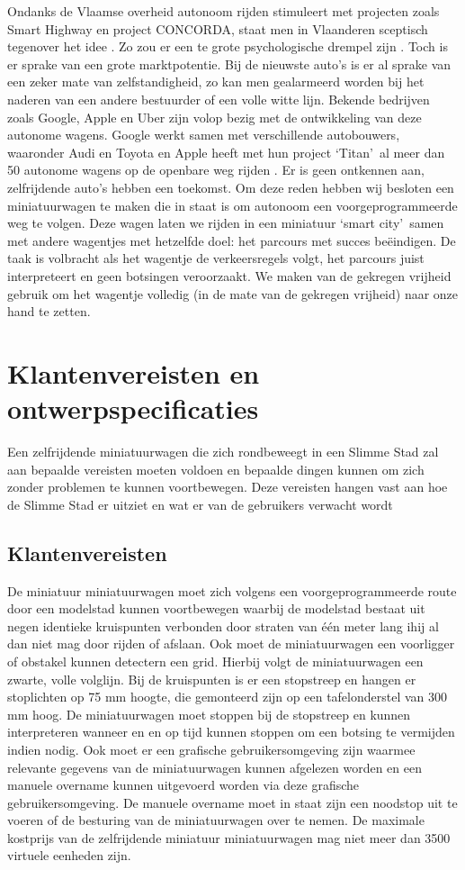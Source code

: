 \documentclass[a4paper,kulak]{kulakarticle}
\begin{document}
Ondanks de Vlaamse overheid autonoom rijden stimuleert met projecten zoals Smart Highway en project CONCORDA, staat men in Vlaanderen sceptisch tegenover het idee \cite{vbn}. Zo zou er een te grote psychologische drempel zijn \cite{scept}. Toch is er sprake van een grote marktpotentie. Bij de nieuwste auto's is er al sprake van een zeker mate van zelfstandigheid, zo kan men gealarmeerd worden bij het naderen van een andere bestuurder of een volle witte lijn. Bekende bedrijven zoals Google, Apple en Uber zijn volop bezig met de ontwikkeling van deze autonome wagens. Google werkt samen met verschillende autobouwers, waaronder Audi en Toyota en Apple heeft met hun project \lq Titan\rq\ al meer dan 50 autonome wagens op de openbare weg rijden \cite{bedrijven}. Er is geen ontkennen aan, zelfrijdende auto's hebben een toekomst. Om deze reden hebben wij besloten een miniatuurwagen te maken die in staat is om autonoom een voorgeprogrammeerde weg te volgen. Deze wagen laten we rijden in een miniatuur \lq smart city\rq\ samen met andere wagentjes met hetzelfde doel: het parcours met succes beëindigen. De taak is volbracht als het wagentje de verkeersregels volgt, het parcours juist interpreteert en geen botsingen veroorzaakt. We maken van de gekregen vrijheid gebruik om het wagentje volledig (in de mate van de gekregen vrijheid) naar onze hand te zetten.

\section{Klantenvereisten en ontwerpspecificaties}
Een zelfrijdende miniatuurwagen die zich rondbeweegt in een Slimme Stad zal aan bepaalde vereisten moeten voldoen en bepaalde dingen kunnen om zich zonder problemen te kunnen voortbewegen. Deze vereisten hangen vast aan hoe de Slimme Stad er uitziet en wat er van de gebruikers verwacht wordt


\subsection{Klantenvereisten}
De miniatuur miniatuurwagen moet zich volgens een voorgeprogrammeerde route door een modelstad kunnen voortbewegen waarbij de modelstad bestaat uit negen identieke kruispunten verbonden door straten van één meter lang ihij al dan niet mag door rijden of afslaan. Ook moet de miniatuurwagen een voorligger of obstakel kunnen detectern een grid. Hierbij volgt de miniatuurwagen een zwarte, volle volglijn. Bij de kruispunten is er een stopstreep en hangen er stoplichten op 75 mm hoogte, die gemonteerd zijn op een tafelonderstel van 300 mm hoog. De miniatuurwagen moet stoppen bij de stopstreep en kunnen interpreteren wanneer en en op tijd kunnen stoppen om een botsing te vermijden indien nodig. Ook moet er een grafische gebruikersomgeving zijn waarmee relevante gegevens van de miniatuurwagen kunnen afgelezen worden en een manuele overname kunnen uitgevoerd worden via deze grafische gebruikersomgeving. De manuele overname moet in staat zijn een noodstop uit te voeren of de besturing van de miniatuurwagen over te nemen. De maximale kostprijs van de zelfrijdende miniatuur miniatuurwagen mag niet meer dan 3500 virtuele eenheden zijn.
\end{document}
